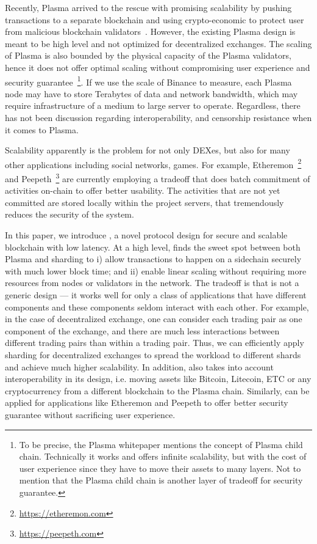 Recently, Plasma arrived to the rescue with promising scalability by pushing transactions to a separate blockchain and using crypto-economic to protect user from malicious blockchain validators~\cite{plasma}. However, the existing Plasma design is meant to be high level and not optimized for decentralized exchanges. The scaling of Plasma is also bounded by the physical capacity of the Plasma validators, hence it does not offer optimal scaling without compromising user experience and security guarantee~\footnote{To be precise, the Plasma whitepaper mentions the concept of Plasma child chain. Technically it works and offers infinite scalability, but with the cost of user experience since they have to move their assets to many layers. Not to mention that the Plasma child chain is another layer of tradeoff for security guarantee.}. If we use the scale of Binance to measure, each Plasma node may have to store Terabytes of data and network bandwidth, which may require infrastructure of a medium to large server to operate. Regardless, there has not been discussion regarding interoperability, and censorship resistance when it comes to Plasma.


Scalability apparently is the problem for not only DEXes, but also for many other applications including social networks, games. For example, Etheremon~\footnote{\url{https://etheremon.com}} and Peepeth~\footnote{\url{https://peepeth.com}} are currently employing a tradeoff that does batch commitment of activities on-chain to offer better usability. The activities that are not yet committed are stored locally within the project servers, that tremendously reduces the security of the system.

In this paper, we introduce \codename, a novel protocol design for secure and scalable blockchain with low latency. At a high level, \codename finds the sweet spot between both Plasma and sharding to i) allow transactions to happen on a sidechain securely with much lower block time; and ii) enable linear scaling without requiring more resources from nodes or validators in the network. The tradeoff is that \codename is not a generic design --- it works well for only a class of applications that have different components and these components seldom interact with each other. For example, in the case of decentralized exchange, one can consider each trading pair as one component of the exchange, and there are much less interactions between different trading pairs than within a trading pair. Thus, we can efficiently apply sharding for decentralized exchanges to spread the workload to different shards and achieve much higher scalability.
In addition, \codename also takes into account interoperability in its design, i.e. moving assets like Bitcoin, Litecoin, ETC or any cryptocurrency from a different blockchain to the Plasma chain. Similarly, \codename can be applied for applications like Etheremon and Peepeth to offer better security guarantee without sacrificing user experience.

